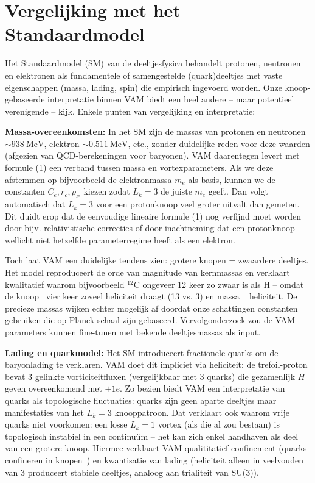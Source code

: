 \section{Vergelijking met het Standaardmodel}

Het Standaardmodel (SM) van de deeltjesfysica behandelt protonen, neutronen en elektronen als fundamentele of samengestelde (quark)deeltjes met vaste eigenschappen (massa, lading, spin) die empirisch ingevoerd worden. Onze knoop-gebaseerde interpretatie binnen VAM biedt een heel andere – maar potentieel verenigende – kijk. Enkele punten van vergelijking en interpretatie:

\textbf{Massa-overeenkomsten:} In het SM zijn de massa\rqs s van protonen en neutronen $\sim938~\text{MeV}$, elektron $\sim0.511~\text{MeV}$, etc., zonder duidelijke reden voor deze waarden (afgezien van QCD-berekeningen voor baryonen). VAM daarentegen levert met formule (1) een verband tussen massa en vortexparameters. Als we deze afstemmen op bijvoorbeeld de elektronmassa $m_e$ als basis, kunnen we de constanten $C_e, r_c, \rho_\text{\ae}$ kiezen zodat $L_k=3$ de juiste $m_e$ geeft. Dan volgt automatisch dat $L_k=3$ voor een protonknoop veel groter uitvalt dan gemeten. Dit duidt erop dat de eenvoudige lineaire formule (1) nog verfijnd moet worden door bijv. relativistische correcties of door inachtneming dat een protonknoop wellicht niet hetzelfde parameterregime heeft als een elektron.

Toch laat VAM een duidelijke tendens zien: grotere knopen = zwaardere deeltjes. Het model reproduceert de orde van magnitude van kernmassa\rqs s en verklaart kwalitatief waarom bijvoorbeeld $^{12}$C ongeveer 12 keer zo zwaar is als H – omdat de knoop ~vier keer zoveel heliciteit draagt (13 vs. 3) en massa ~ heliciteit. De precieze massa\rqs s wijken echter mogelijk af doordat onze schattingen constanten gebruiken die op Planck-schaal zijn gebaseerd. Vervolgonderzoek zou de VAM-parameters kunnen fine-tunen met bekende deeltjesmassa\rqs s als input.

\textbf{Lading en quarkmodel:} Het SM introduceert fractionele quarks om de baryonlading te verklaren. VAM doet dit impliciet via heliciteit: de
trefoil-proton bevat 3 gelinkte vorticiteitfluxen (vergelijkbaar met 3 quarks) die gezamenlijk $H$ geven overeenkomend met $+1e$. Zo bezien biedt VAM een interpretatie van quarks als topologische fluctuaties: quarks zijn geen aparte deeltjes maar manifestaties van het $L_k=3$ knooppatroon. Dat verklaart ook waarom vrije quarks niet voorkomen: een losse $L_k=1$ vortex (als die al zou bestaan) is topologisch instabiel in een continuüm – het kan zich enkel handhaven als deel van een grotere knoop. Hiermee verklaart VAM qualititatief confinement (quarks confineren in knopen~\cite{Faddeev1997KnottedSolitions}) en kwantisatie van lading (heliciteit alleen in veelvouden van 3 produceert stabiele deeltjes, analoog aan trialiteit van SU(3)).

